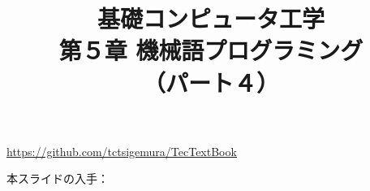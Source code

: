 \documentclass{beamer}                 %
\begin{document}
\title{基礎コンピュータ工学\\第５章 機械語プログラミング\\（パート４）}
\date{}

\begin{frame}
  \titlepage
  \centerline{\url{https://github.com/tctsigemura/TecTextBook}}
  \vfill
  \centerline{本スライドの入手：
    }
\end{frame}

\end{document}
